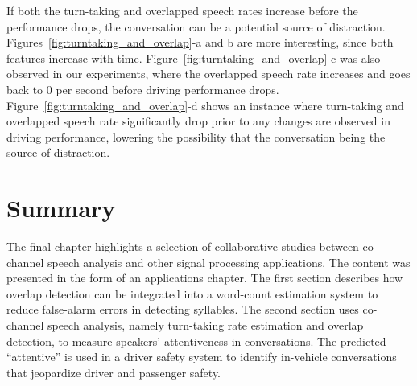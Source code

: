 \newpage
If both the turn-taking and overlapped speech rates increase before the performance drops, the conversation can be a potential source of distraction. 
Figures~\ref{fig:turntaking_and_overlap}-a and b are more interesting, since both features increase with time. 
Figure~\ref{fig:turntaking_and_overlap}-c was also observed in our experiments, where the overlapped speech rate increases and goes back to $0$ per second before driving performance drops. 
Figure~\ref{fig:turntaking_and_overlap}-d shows an instance where turn-taking and overlapped speech rate significantly drop prior to any changes are observed in driving performance, lowering the possibility that the conversation being the source of distraction. 

\newpage
\section{Summary}
\label{sec:ch4_summary}
The final chapter highlights a selection of collaborative studies between co-channel speech analysis and other signal processing applications. 
The content was presented in the form of an applications chapter. 
The first section describes how overlap detection can be integrated into a word-count estimation system to reduce false-alarm errors in detecting syllables. 
The second section uses co-channel speech analysis, namely turn-taking rate estimation and overlap detection, to measure speakers' attentiveness in conversations. 
The predicted ``attentive'' is used in a driver safety system to identify in-vehicle conversations that jeopardize driver and passenger safety. 
